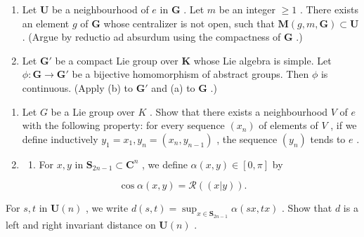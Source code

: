 \begin{enumerate}
\def\labelenumi{(\alph{enumi})}
\setcounter{enumi}{1}
\item
  Let \(\mathbf{U}\) be a neighbourhood of \(e\) in \(\mathbf{G}\) . Let \(m\) be an integer \(\geqslant 1\) . There exists an element \(g\) of \(\mathbf{G}\) whose centralizer is not open, such that \(\mathbf{M}(g, m, \mathbf{G}) \subset \mathbf{U}\) . (Argue by reductio ad absurdum using the compactness of \(\mathbf{G}\) .)
\item
  Let \(\mathbf{G}'\) be a compact Lie group over \(\mathbf{K}\) whose Lie algebra is simple. Let \(\phi: \mathbf{G} \to \mathbf{G}'\) be a bijective homomorphism of abstract groups. Then \(\phi\) is continuous. (Apply (b) to \(\mathbf{G}'\) and (a) to \(\mathbf{G}\) .)
\end{enumerate}

\begin{enumerate}
\def\labelenumi{\arabic{enumi}.}
\setcounter{enumi}{9}
\item
  Let \(G\) be a Lie group over \(K\) . Show that there exists a neighbourhood \(V\) of \(e\) with the following property: for every sequence \((x_{n})\) of elements of \(V\) , if we define inductively \(y_{1} = x_{1}, y_{n} = (x_{n}, y_{n-1})\) , the sequence \((y_{n})\) tends to \(e\) .
\item
  \begin{enumerate}
  \def\labelenumii{(\alph{enumii})}
  \tightlist
  \item
    For \(x, y\) in \(\mathbf{S}_{2n-1} \subset \mathbf{C}^n\) , we define \(\alpha(x, y) \in [0, \pi]\) by
  \end{enumerate}
\end{enumerate}

\[
\cos \alpha (x, y) = \mathscr {R} ((x | y)).
\]

For \(s, t\) in \(\mathbf{U}(n)\) , we write \(d(s, t) = \sup_{x \in \mathbf{S}_{2n-1}} \alpha(sx, tx)\) . Show that \(d\) is a left and right invariant distance on \(\mathbf{U}(n)\) .

